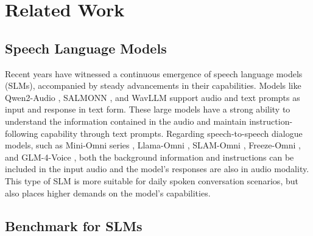 \section{Related Work}
\subsection{Speech Language Models}
Recent years have witnessed a continuous emergence of speech language models (SLMs), accompanied by steady advancements in their capabilities. Models like Qwen2-Audio \citep{chu2024qwen2-audio}, SALMONN \citep{tang2023salmonn}, and WavLLM \citep{hu2024wavllm} support audio and text prompts as input and response in text form. These large models have a strong ability to understand the information contained in the audio and maintain instruction-following capability through text prompts. Regarding speech-to-speech dialogue models, such as Mini-Omni series \citep{xie2024mini, xie2024mini2}, Llama-Omni \citep{fang2024llama}, SLAM-Omni \citep{chen2024slam}, Freeze-Omni \citep{wang2024freeze}, and GLM-4-Voice \citep{zeng2024glm}, both the background information and instructions can be included in the input audio and the model's responses are also in audio modality. This type of SLM is more suitable for daily spoken conversation scenarios, but also places higher demands on the model's capabilities.

\subsection{Benchmark for SLMs}

